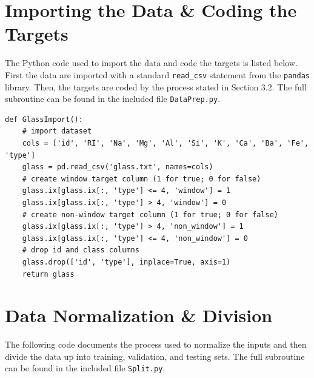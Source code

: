 \documentclass[12pt,halfline,a4paper]{ouparticle}
\begin{document}
\pagebreak

\printbibliography[heading=bibintoc, title={References}]

\pagebreak
\appendix

\section{Importing the Data \& Coding the Targets}

The Python code used to import the data and code the targets is listed below. First the data are imported with a standard \verb|read_csv| statement from the \verb|pandas| library. Then, the targets are coded by the process stated in Section 3.2. The full subroutine can be found in the included file \verb|DataPrep.py|.

\begin{lstlisting}[style = Python]
def GlassImport():
    # import dataset
    cols = ['id', 'RI', 'Na', 'Mg', 'Al', 'Si', 'K', 'Ca', 'Ba', 'Fe', 'type']
    glass = pd.read_csv('glass.txt', names=cols)
    # create window target column (1 for true; 0 for false)
    glass.ix[glass.ix[:, 'type'] <= 4, 'window'] = 1
    glass.ix[glass.ix[:, 'type'] > 4, 'window'] = 0
    # create non-window target column (1 for true; 0 for false)
    glass.ix[glass.ix[:, 'type'] > 4, 'non_window'] = 1
    glass.ix[glass.ix[:, 'type'] <= 4, 'non_window'] = 0
    # drop id and class columns
    glass.drop(['id', 'type'], inplace=True, axis=1)
    return glass
\end{lstlisting} 
\pagebreak

\section{Data Normalization \& Division}
The following code documents the process used to normalize the inputs and then divide the data up into training, validation, and testing sets. The full subroutine can be found in the included file \verb|Split.py|.
\end{document}
